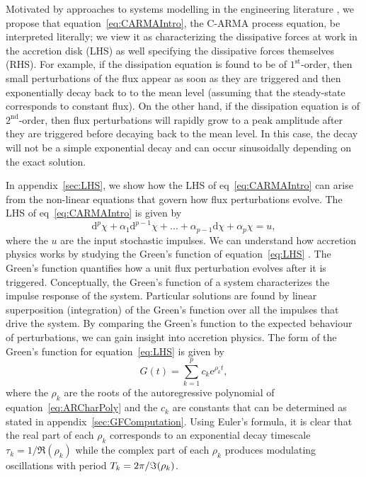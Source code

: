 \documentclass[a4paper,fleqn,usenatbib]{mnras}
\begin{document}
Motivated by approaches to systems modelling in the engineering literature \citep{PanditWu}, we propose that equation~\eqref{eq:CARMAIntro}, the C-ARMA process equation, be interpreted literally; we view it as characterizing the dissipative forces at work in the accretion disk (LHS) as well specifying the dissipative forces themselves (RHS). For example, if the dissipation equation is found to be of $1^{\mathrm{st}}$-order, then small perturbations of the flux appear as soon as they are triggered and then exponentially decay back to to the mean level (assuming that the steady-state corresponds to constant flux). On the other hand, if the dissipation equation is of $2^{\mathrm{nd}}$-order, then flux perturbations will rapidly grow to a peak amplitude after they are triggered before decaying back to the mean level. In this case, the decay will not be a simple exponential decay and can occur sinusoidally depending on the exact solution.

In appendix~\ref{sec:LHS}, we show how the LHS of eq~\eqref{eq:CARMAIntro} can arise from the non-linear equations that govern how flux perturbations evolve. The LHS of eq~\eqref{eq:CARMAIntro} is given by
\begin{equation}\label{eq:LHS}
\mathrm{d}^{p}\chi + \alpha_{1} \mathrm{d}^{p-1}\chi + \ldots + \alpha_{p-1} \mathrm{d}\chi + \alpha_{p} \chi = u,
\end{equation}
where the $u$ are the input stochastic impulses. We can understand how accretion physics works by studying the Green's function of equation~\eqref{eq:LHS} \citep{PanditWu}. The Green's function quantifies how a unit flux perturbation evolves after it is triggered. Conceptually, the Green's function of a system characterizes the impulse response of the system. Particular solutions are found by linear superposition (integration) of the Green's function over all the impulses that drive the system. By comparing the Green's function to the expected behaviour of perturbations, we can gain insight into accretion physics. The form of the Green's function for equation~\eqref{eq:LHS} is given by
\begin{equation}\label{eq:GFSol}
G(t) = \sum_{k = 1}^{p} c_{k} \mathrm{e}^{\rho_{k}t},
\end{equation}
where the $\rho_{k}$ are the roots of the autoregressive polynomial of equation~\eqref{eq:ARCharPoly} and the $c_{k}$ are constants that can be determined as stated in appendix~\ref{sec:GFComputation}. Using Euler's formula, it is clear that the real part of each $\rho_{k}$ corresponds to an exponential decay timescale $\tau_{k} = 1/\Re(\rho_{k})$ while the complex part of each $\rho_{k}$ produces modulating oscillations with period $T_{k} = 2\pi/\Im(\rho_{k})$.
\end{document}
